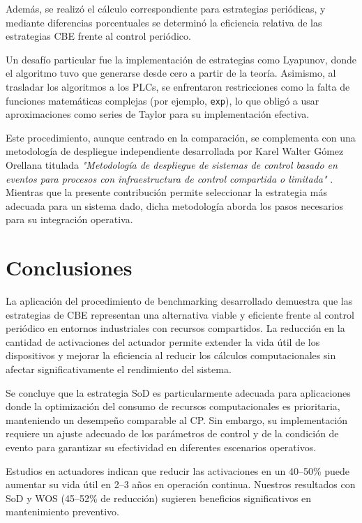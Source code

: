 \documentclass[conference]{IEEEtran}
\begin{document}
Además, se realizó el cálculo correspondiente para estrategias periódicas, y mediante diferencias porcentuales se determinó la eficiencia relativa de las estrategias CBE frente al control periódico.

Un desafío particular fue la implementación de estrategias como Lyapunov, donde el algoritmo tuvo que generarse desde cero a partir de la teoría. Asimismo, al trasladar los algoritmos a los PLCs, se enfrentaron restricciones como la falta de funciones matemáticas complejas (por ejemplo, \texttt{exp}), lo que obligó a usar aproximaciones como series de Taylor para su implementación efectiva.

Este procedimiento, aunque centrado en la comparación, se complementa con una metodología de despliegue independiente desarrollada por Karel Walter Gómez Orellana titulada \textit{"Metodología de despliegue de sistemas de control basado en eventos para procesos con infraestructura de control compartida o limitada"} \cite{Gomez2025}. Mientras que la presente contribución permite seleccionar la estrategia más adecuada para un sistema dado, dicha metodología aborda los pasos necesarios para su integración operativa.

\section{Conclusiones}
La aplicación del procedimiento de benchmarking desarrollado demuestra que las estrategias de CBE representan una alternativa viable y eficiente frente al control periódico en entornos industriales con recursos compartidos. La reducción en la cantidad de activaciones del actuador permite extender la vida útil de los dispositivos y mejorar la eficiencia al reducir los cálculos computacionales sin afectar significativamente el rendimiento del sistema.

Se concluye que la estrategia SoD es particularmente adecuada para aplicaciones donde la optimización del consumo de recursos computacionales es prioritaria, manteniendo un desempeño comparable al CP. Sin embargo, su implementación requiere un ajuste adecuado de los parámetros de control y de la condición de evento para garantizar su efectividad en diferentes escenarios operativos.

Estudios en actuadores indican que reducir las activaciones en un 40--50\% puede aumentar su vida útil en 2--3 años en operación continua. Nuestros resultados con SoD y WOS (45--52\% de reducción) sugieren beneficios significativos en mantenimiento preventivo.
\end{document}

